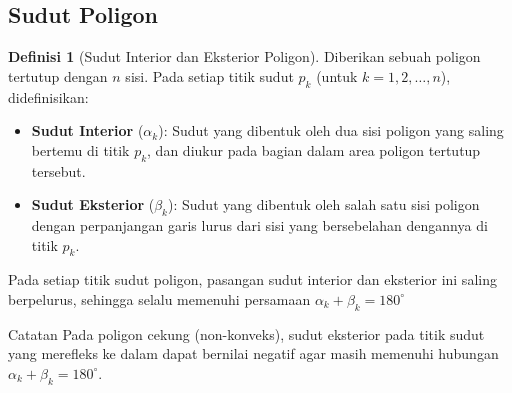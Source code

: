 ﻿\documentclass[aspectratio=169]{beamer}
\theoremstyle{definition}
\newtheorem{definisi}{Definisi}
\begin{document}
\subsection{Sudut Poligon}
\begin{frame}{\insertsection}{\insertsubsection}
  \begin{definisi}[Sudut Interior dan Eksterior Poligon]
    Diberikan sebuah poligon tertutup dengan $n$ sisi. Pada setiap titik sudut $p_k$ (untuk $k = 1, 2, \dots, n$), didefinisikan:
    \begin{itemize}
      \item \textbf{Sudut Interior} ($\alpha_k$): Sudut yang dibentuk oleh dua sisi poligon yang saling bertemu di titik $p_k$, dan diukur pada bagian dalam area poligon tertutup tersebut.
      \item \textbf{Sudut Eksterior} ($\beta_k$): Sudut yang dibentuk oleh salah satu sisi poligon dengan perpanjangan garis lurus dari sisi yang bersebelahan dengannya di titik $p_k$.
    \end{itemize}
    Pada setiap titik sudut poligon, pasangan sudut interior dan eksterior ini saling berpelurus, sehingga selalu memenuhi persamaan $\alpha_k + \beta_k = 180^\circ$
  \end{definisi}
  \begin{alertblock}{Catatan}
    Pada poligon cekung (non-konveks), sudut eksterior pada titik sudut yang merefleks ke dalam dapat bernilai negatif agar masih memenuhi hubungan $\alpha_k + \beta_k = 180^\circ$.
  \end{alertblock}
\end{frame}
\end{document}
